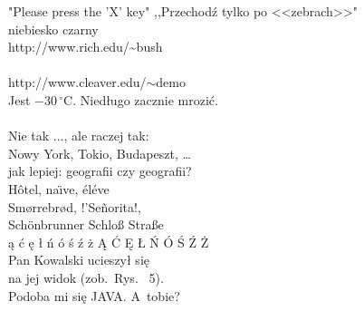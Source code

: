 "Please press the 'X' key"
\newline,,Przechodź tylko po <<zebrach>>"
\\niebiesko {\dywiz} czarny
\\http://www.rich.edu/\~{}bush \\
\\http://www.cleaver.edu/$\sim$demo
\\Jest $-30\,^{\circ}\mathrm{C}$.
Niedługo zacznie mrozić.
\\ \texteuro
\\Nie tak ..., ale raczej tak:\\ Nowy York, Tokio, Budapeszt, \ldots
\\ jak lepiej: geografii czy geograf\mbox{}ii?
\\ H\^otel, na\"\i ve, \'el\'eve \\ Sm\o rrebr\o d, !'Se\~norita!, \\ Sch\"onbrunner Schlo\ss{}
Stra\ss e \\
\k{a} \'c \k{e} \l{} \'n \'o \'s \'z \.z \k{A} \'C \k{E} \L{} \'N \'O \'S \'Z \.Z 
\\ Pan Kowalski ucieszył się\\ na jej widok (zob.~Rys. ~5).\\ Podoba mi się JAVA\@. A~tobie?


     
              
